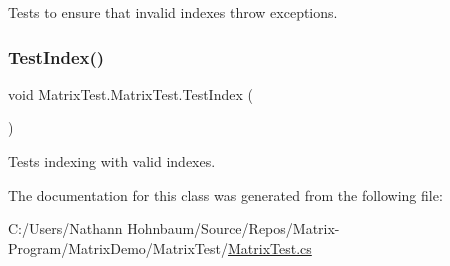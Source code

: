 Tests to ensure that invalid indexes throw exceptions. 

\mbox{\label{class_matrix_test_1_1_matrix_test_a0b1c95f31d09e8a879d2b36acf4c3e87}} 
\subsubsection{\texorpdfstring{Test\+Index()}{TestIndex()}}
{\footnotesize\ttfamily void Matrix\+Test.\+Matrix\+Test.\+Test\+Index (\begin{DoxyParamCaption}{ }\end{DoxyParamCaption})}



Tests indexing with valid indexes. 



The documentation for this class was generated from the following file\+:\begin{DoxyCompactItemize}
\item 
C\+:/\+Users/\+Nathann Hohnbaum/\+Source/\+Repos/\+Matrix-\/\+Program/\+Matrix\+Demo/\+Matrix\+Test/\mbox{\hyperlink{_matrix_test_8cs}{Matrix\+Test.\+cs}}\end{DoxyCompactItemize}
